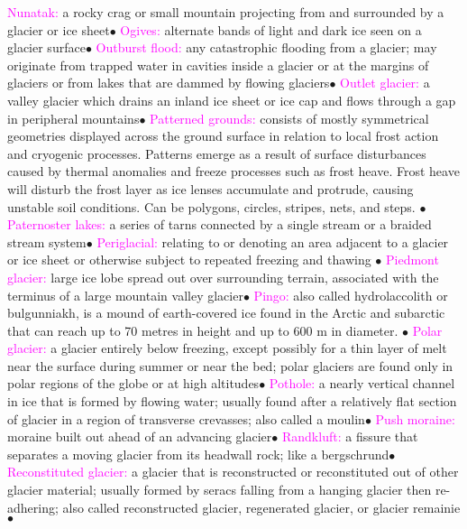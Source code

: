 \documentclass{article}
\newcommand{\ddd}{$\bullet$}
\newcommand{\pink}[1]{\textcolor{magenta}{#1}}
\newcommand{\vocab}[1]{{\pink{#1}}}
\begin{document}
\begin{multicols*}{4}
		\vocab{        Nunatak: } a rocky crag or small mountain projecting from and surrounded by a glacier or ice sheet\ddd
		\vocab{        Ogives: } alternate bands of light and dark ice seen on a glacier surface\ddd
		\vocab{        Outburst flood: } any catastrophic flooding from a glacier; may originate from trapped water in cavities inside a glacier or at the margins of glaciers or from lakes that are dammed by flowing glaciers\ddd
		\vocab{        Outlet glacier: } a valley glacier which drains an inland ice sheet or ice cap and flows through a gap in peripheral mountains\ddd
		\vocab{        Patterned grounds: } consists of mostly symmetrical geometries displayed across the ground surface in relation to local frost action and cryogenic processes. Patterns emerge as a result of surface disturbances caused by thermal anomalies and freeze processes such as frost heave. Frost heave will disturb the frost layer as ice lenses accumulate and protrude, causing unstable soil conditions. Can be polygons, circles, stripes, nets, and steps. \ddd
		\vocab{        Paternoster lakes: } a series of tarns connected by a single stream or a braided stream system\ddd
		\vocab{        Periglacial: } relating to or denoting an area adjacent to a glacier or ice sheet or otherwise subject to repeated freezing and thawing \ddd        
		\vocab{        Piedmont glacier: } large ice lobe spread out over surrounding terrain, associated with the terminus of a large mountain valley glacier\ddd
		\vocab{        Pingo: } also called hydrolaccolith or bulgunniakh, is a mound of earth-covered ice found in the Arctic and subarctic that can reach up to 70 metres in height and up to 600 m in diameter. \ddd       
		\vocab{        Polar glacier: } a glacier entirely below freezing, except possibly for a thin layer of melt near the surface during summer or near the bed; polar glaciers are found only in polar regions of the globe or at high altitudes\ddd
		\vocab{        Pothole: } a nearly vertical channel in ice that is formed by flowing water; usually found after a relatively flat section of glacier in a region of transverse crevasses; also called a moulin\ddd
		\vocab{        Push moraine: } moraine built out ahead of an advancing glacier\ddd
		\vocab{        Randkluft: } a fissure that separates a moving glacier from its headwall rock; like a bergschrund\ddd
		\vocab{        Reconstituted glacier: } a glacier that is reconstructed or reconstituted out of other glacier material; usually formed by seracs falling from a hanging glacier then re-adhering; also called reconstructed glacier, regenerated glacier, or glacier remainie\ddd

\end{multicols*}
\end{document}
